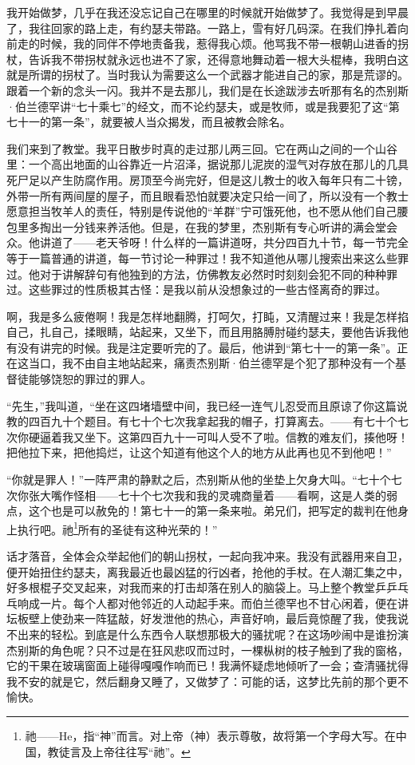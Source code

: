\par 我开始做梦，几乎在我还没忘记自己在哪里的时候就开始做梦了。我觉得是到早晨了，我往回家的路上走，有约瑟夫带路。一路上，雪有好几码深。在我们挣扎着向前走的时候，我的同伴不停地责备我，惹得我心烦。他骂我不带一根朝山进香的拐杖，告诉我不带拐杖就永远也进不了家，还得意地舞动着一根大头棍棒，我明白这就是所谓的拐杖了。当时我认为需要这么一个武器才能进自己的家，那是荒谬的。跟着一个新的念头一闪。我并不是去那儿，我们是在长途跋涉去听那有名的杰别斯·伯兰德罕讲“七十乘七”的经文，而不论约瑟夫，或是牧师，或是我要犯了这“第七十一的第一条”，就要被人当众揭发，而且被教会除名。
\par 我们来到了教堂。我平日散步时真的走过那儿两三回。它在两山之间的一个山谷里：一个高出地面的山谷靠近一片沼泽，据说那儿泥炭的湿气对存放在那儿的几具死尸足以产生防腐作用。房顶至今尚完好，但是这儿教士的收入每年只有二十镑，外带一所有两间屋的屋子，而且眼看恐怕就要决定只给一间了，所以没有一个教士愿意担当牧羊人的责任，特别是传说他的“羊群”宁可饿死他，也不愿从他们自己腰包里多掏出一分钱来养活他。但是，在我的梦里，杰别斯有专心听讲的满会堂会众。他讲道了——老天爷呀！什么样的一篇讲道呀，共分四百九十节，每一节完全等于一篇普通的讲道，每一节讨论一种罪过！我不知道他从哪儿搜索出来这么些罪过。他对于讲解辞句有他独到的方法，仿佛教友必然时时刻刻会犯不同的种种罪过。这些罪过的性质极其古怪：是我以前从没想象过的一些古怪离奇的罪过。
\par 啊，我是多么疲倦啊！我是怎样地翻腾，打呵欠，打盹，又清醒过来！我是怎样掐自己，扎自己，揉眼睛，站起来，又坐下，而且用胳膊肘碰约瑟夫，要他告诉我他有没有讲完的时候。我是注定要听完的了。最后，他讲到“第七十一的第一条”。正在这当口，我不由自主地站起来，痛责杰别斯·伯兰德罕是个犯了那种没有一个基督徒能够饶恕的罪过的罪人。
\par “先生，”我叫道，“坐在这四堵墙壁中间，我已经一连气儿忍受而且原谅了你这篇说教的四百九十个题目。有七十个七次我拿起我的帽子，打算离去。——有七十个七次你硬逼着我又坐下。这第四百九十一可叫人受不了啦。信教的难友们，揍他呀！把他拉下来，把他捣烂，让这个知道有他这个人的地方从此再也见不到他吧！”
\par “你就是罪人！”一阵严肃的静默之后，杰别斯从他的坐垫上欠身大叫。“七十个七次你张大嘴作怪相——七十个七次我和我的灵魂商量着——看啊，这是人类的弱点，这个也是可以赦免的！第七十一的第一条来啦。弟兄们，把写定的裁判在他身上执行吧。祂\footnote{祂——He，指“神”而言。对上帝（神）表示尊敬，故将第一个字母大写。在中国，教徒言及上帝往往写“祂”。}所有的圣徒有这种光荣的！”
\par 话才落音，全体会众举起他们的朝山拐杖，一起向我冲来。我没有武器用来自卫，便开始扭住约瑟夫，离我最近也最凶猛的行凶者，抢他的手杖。在人潮汇集之中，好多根棍子交叉起来，对我而来的打击却落在别人的脑袋上。马上整个教堂乒乒乓乓响成一片。每个人都对他邻近的人动起手来。而伯兰德罕也不甘心闲着，便在讲坛板壁上使劲来一阵猛敲，好发泄他的热心，声音好响，最后竟惊醒了我，使我说不出来的轻松。到底是什么东西令人联想那极大的骚扰呢？在这场吵闹中是谁扮演杰别斯的角色呢？只不过是在狂风悲叹而过时，一棵枞树的枝子触到了我的窗格，它的干果在玻璃窗面上碰得嘎嘎作响而已！我满怀疑虑地倾听了一会；查清骚扰得我不安的就是它，然后翻身又睡了，又做梦了：可能的话，这梦比先前的那个更不愉快。
